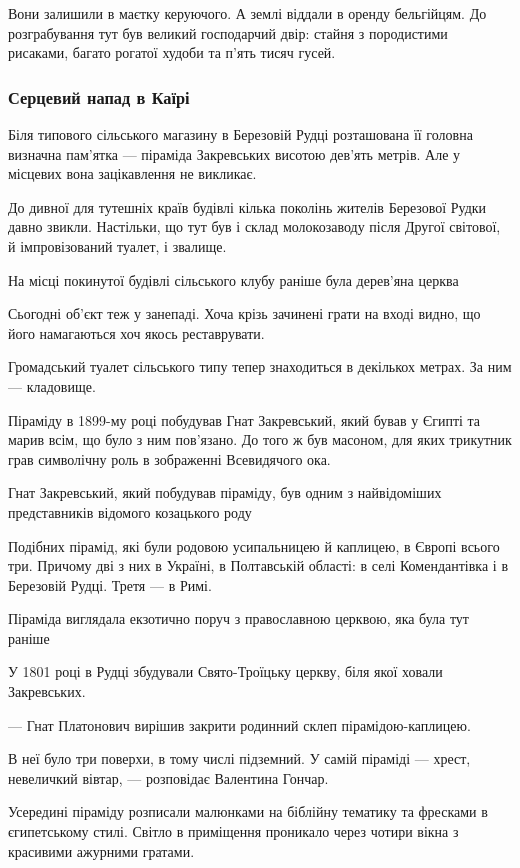 Вони залишили в маєтку керуючого. А землі віддали в оренду бельгійцям. До
розграбування тут був великий господарчий двір: стайня з породистими рисаками,
багато рогатої худоби та п’ять тисяч гусей.
  
\subsubsection{Серцевий напад в Каїрі}

Біля типового сільського магазину в Березовій Рудці розташована її головна
визначна пам'ятка ---  піраміда Закревських висотою дев'ять метрів. Але у
місцевих вона зацікавлення не викликає.

До дивної для тутешніх країв будівлі кілька поколінь жителів Березової Рудки
давно звикли. Настільки, що тут був і склад молокозаводу після Другої світової,
й імпровізований туалет, і звалище.

На місці покинутої будівлі сільського клубу раніше була дерев'яна церква

Сьогодні об'єкт теж у занепаді. Хоча крізь зачинені грати на вході видно, що
його намагаються хоч якось реставрувати.

Громадський туалет сільського типу тепер знаходиться в декількох метрах. За ним
--- кладовище.

Піраміду в 1899-му році побудував Гнат Закревський, який бував у Єгипті та
марив всім, що було з ним пов'язано. До того ж був масоном, для яких трикутник
грав символічну роль в зображенні Всевидячого ока.

Гнат Закревський, який побудував піраміду, був одним з найвідоміших
представників відомого козацького роду

Подібних пірамід, які були родовою усипальницею й каплицею, в Європі всього
три. Причому дві з них в Україні, в Полтавській області: в селі Комендантівка і
в Березовій Рудці. Третя --- в Римі.

Піраміда виглядала екзотично поруч з православною церквою, яка була тут раніше

У 1801 році в Рудці збудували Свято-Троїцьку церкву, біля якої ховали
Закревських.

--- Гнат Платонович вирішив закрити родинний склеп пірамідою-каплицею. 

В неї було три поверхи, в тому числі підземний. У самій піраміді --- хрест,
невеличкий вівтар, --- розповідає Валентина Гончар.

Усередині піраміду розписали малюнками на біблійну тематику та фресками в
єгипетському стилі. Світло в приміщення проникало через чотири вікна з
красивими ажурними гратами.

